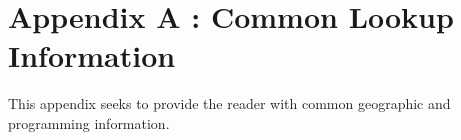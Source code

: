 %
%



\chapter*{Appendix A : Common Lookup Information}

This appendix seeks to provide the reader with common geographic and programming information.




